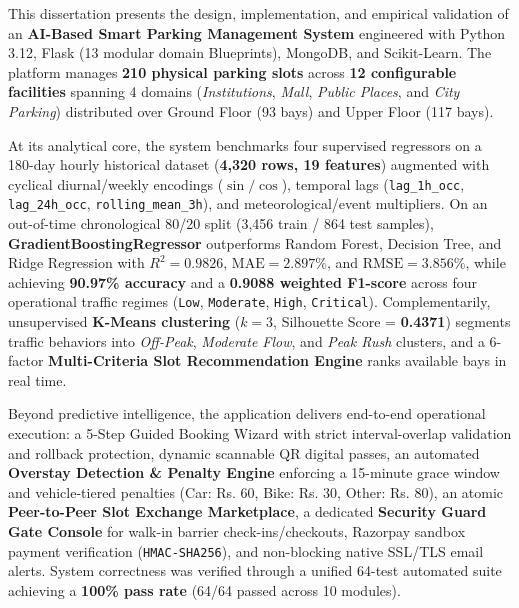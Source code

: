\documentclass[12pt,a4paper,oneside]{report}
\begin{document}
This dissertation presents the design, implementation, and empirical validation of an \textbf{AI-Based Smart Parking Management System} engineered with Python 3.12, Flask (13 modular domain Blueprints), MongoDB, and Scikit-Learn. The platform manages \textbf{210 physical parking slots} across \textbf{12 configurable facilities} spanning 4 domains (\textit{Institutions}, \textit{Mall}, \textit{Public Places}, and \textit{City Parking}) distributed over Ground Floor (93 bays) and Upper Floor (117 bays).

At its analytical core, the system benchmarks four supervised regressors on a 180-day hourly historical dataset (\textbf{4,320 rows, 19 features}) augmented with cyclical diurnal/weekly encodings ($\sin/\cos$), temporal lags (\texttt{lag\_1h\_occ}, \texttt{lag\_24h\_occ}, \texttt{rolling\_mean\_3h}), and meteorological/event multipliers. On an out-of-time chronological 80/20 split (3,456 train / 864 test samples), \textbf{GradientBoostingRegressor} outperforms Random Forest, Decision Tree, and Ridge Regression with \textbf{$R^2 = 0.9826$}, \textbf{$\text{MAE} = 2.897\%$}, and \textbf{$\text{RMSE} = 3.856\%$}, while achieving \textbf{90.97\% accuracy} and a \textbf{0.9088 weighted F1-score} across four operational traffic regimes (\texttt{Low}, \texttt{Moderate}, \texttt{High}, \texttt{Critical}). Complementarily, unsupervised \textbf{K-Means clustering} ($k=3$, Silhouette Score = \textbf{0.4371}) segments traffic behaviors into \textit{Off-Peak}, \textit{Moderate Flow}, and \textit{Peak Rush} clusters, and a 6-factor \textbf{Multi-Criteria Slot Recommendation Engine} ranks available bays in real time.

Beyond predictive intelligence, the application delivers end-to-end operational execution: a 5-Step Guided Booking Wizard with strict interval-overlap validation and rollback protection, dynamic scannable QR digital passes, an automated \textbf{Overstay Detection \& Penalty Engine} enforcing a 15-minute grace window and vehicle-tiered penalties (Car: Rs. 60, Bike: Rs. 30, Other: Rs. 80), an atomic \textbf{Peer-to-Peer Slot Exchange Marketplace}, a dedicated \textbf{Security Guard Gate Console} for walk-in barrier check-ins/checkouts, Razorpay sandbox payment verification (\texttt{HMAC-SHA256}), and non-blocking native SSL/TLS email alerts. System correctness was verified through a unified 64-test automated suite achieving a \textbf{100\% pass rate} (64/64 passed across 10 modules).

\clearpage
\tableofcontents
\clearpage
\listoffigures
\clearpage
\listoftables
\clearpage
\end{document}
